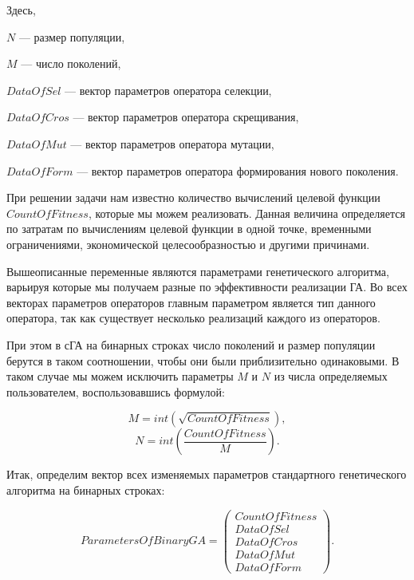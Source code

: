 Здесь,

$N$ --- размер популяции,

$M$ --- число поколений,

$ DataOfSel $ --- вектор параметров оператора селекции,

$ DataOfCros $ --- вектор параметров оператора скрещивания,

$ DataOfMut $ --- вектор параметров оператора мутации,

$ DataOfForm $ --- вектор параметров оператора формирования нового поколения.

При решении задачи нам известно количество вычислений целевой функции $ CountOfFitness $, которые мы можем реализовать. Данная величина определяется по затратам по вычислениям целевой функции в одной точке, временными ограничениями, экономической целесообразностью и другими причинами.

Вышеописанные переменные являются параметрами генетического алгоритма, варьируя которые мы получаем разные по эффективности реализации ГА. Во всех векторах параметров операторов главным параметром является тип данного оператора, так как существует несколько реализаций каждого из операторов.

При этом в сГА на бинарных строках число поколений и размер популяции берутся в таком соотношении, чтобы они были приблизительно одинаковыми. В таком случае мы можем исключить параметры $ M $ и $ N $ из числа определяемых пользователем, воспользовавшись формулой:

\begin{equation}
\label{StandardGA:eq:countM}
M=int \left( \sqrt{CountOfFitness}\right),
\end{equation}
\begin{equation*}
N=int \left( \dfrac{CountOfFitness}{M}\right).
\end{equation*}

Итак, определим вектор всех изменяемых параметров стандартного генетического алгоритма на бинарных строках:

\begin{equation}
\label{StandardGA:eq:ParametersOfBinaryGA}
ParametersOfBinaryGA=  \left( \begin{array}{c} CountOfFitness \\ DataOfSel \\ DataOfCros \\ DataOfMut \\ DataOfForm \end{array}\right).
\end{equation}

